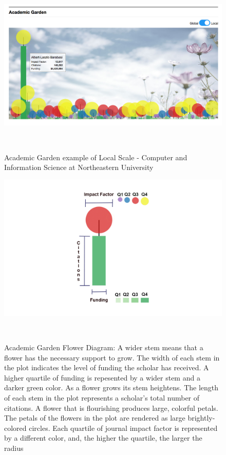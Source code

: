\begin{figure}
    \centering
    \includegraphics[width=1\textwidth]{figures/fig-AG-local.png}
    \caption{Academic Garden example of Local Scale - Computer and Information Science at Northeastern University}~\label{fig-AG-global}
\end{figure}

\begin{figure}
    \centering
    \includegraphics[width=1\textwidth]{figures/fig-flower.png}
    \caption{Academic Garden Flower Diagram: A wider stem means that a flower has the necessary support to grow. The width of each stem in the plot indicates the level of funding the scholar has received. A higher quartile of funding is repesented by a wider stem and a darker green color. As a flower grows its stem heightens. The length of each stem in the plot represents a scholar's total number of citations. A flower that is flourishing produces large, colorful petals. The petals of the flowers in the plot are rendered as large brightly-colored circles. Each quartile of journal impact factor is represented by a different color, and, the higher the quartile, the larger the radius}~\label{fig-flower-diagram}
\end{figure}



